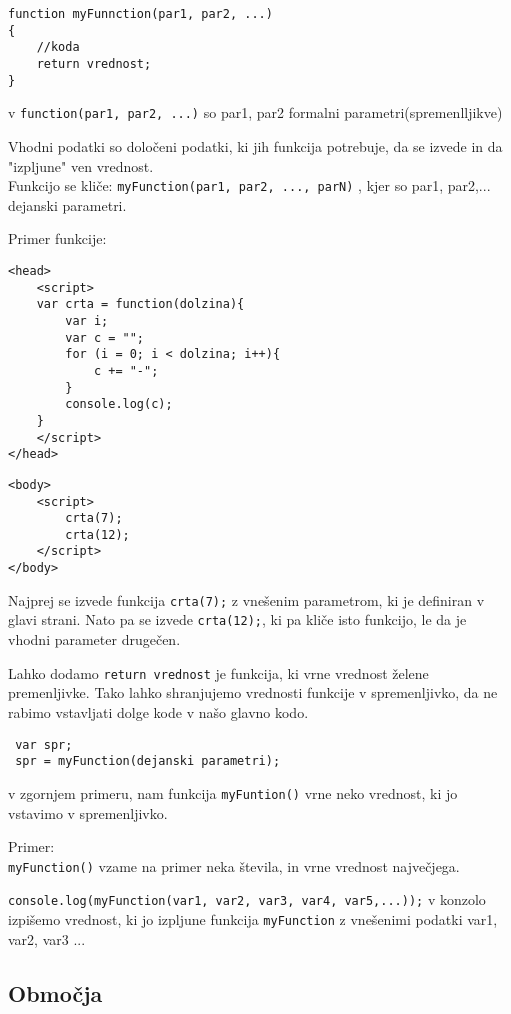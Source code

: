 \begin{verbatim}
function myFunnction(par1, par2, ...)
{
    //koda
    return vrednost;
}

\end{verbatim}

v \texttt{function(par1, par2, ...)} so par1, par2 formalni parametri(spremenlljikve)
 
Vhodni podatki so določeni podatki, ki jih funkcija potrebuje, da se izvede in da "izpljune" ven vrednost.\\

Funkcijo se kliče: \texttt{myFunction(par1, par2, ..., parN)} , kjer so par1, par2,... dejanski parametri.

\newpage
Primer funkcije:

\begin{verbatim}
<head>
    <script>
    var crta = function(dolzina){
        var i;
        var c = "";
        for (i = 0; i < dolzina; i++){
            c += "-";
        }
        console.log(c);
    }
    </script>
</head>
\end{verbatim}
\begin{verbatim}
<body>
    <script>
        crta(7);
        crta(12);
    </script>
</body>
\end{verbatim}

Najprej se izvede funkcija \texttt{crta(7);} z vnešenim parametrom, ki je definiran v glavi strani. Nato pa se izvede \texttt{crta(12);}, ki pa kliče isto funkcijo, le da je vhodni parameter drugečen.

Lahko dodamo  \texttt{return vrednost} je funkcija, ki vrne vrednost želene premenljivke.
Tako lahko shranjujemo vrednosti funkcije v spremenljivko, da ne rabimo vstavljati dolge kode v našo glavno kodo.

\begin{verbatim}
 var spr;
 spr = myFunction(dejanski parametri);
\end{verbatim}
v zgornjem primeru, nam funkcija \texttt{myFuntion()} vrne neko vrednost, ki jo vstavimo v spremenljivko.

Primer:\\
\texttt{myFunction()} vzame na primer neka števila, in vrne vrednost največjega.

\texttt{console.log(myFunction(var1, var2, var3, var4, var5,...));} v konzolo izpišemo vrednost, ki jo izpljune funkcija \texttt{myFunction} z vnešenimi podatki var1, var2, var3 ...

\subsection*{Območja}

